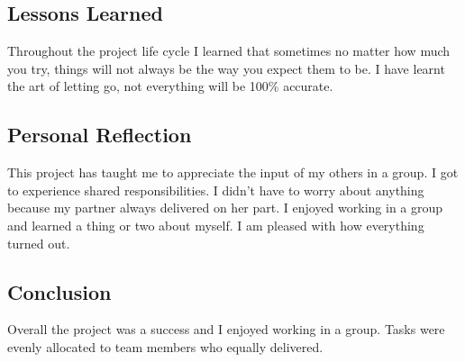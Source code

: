 \documentclass[10pt,twocolumn]{witseiepaper}
\begin{document}
\subsection{\textbf{Lessons Learned}}
Throughout the project life cycle I learned that sometimes no matter how much you try, 
things will not always be the way you expect them to be. I have learnt the art of letting go, not everything will be 100\% accurate.

\subsection{\textbf{Personal Reflection}}
This project has taught me to appreciate the input of my others in a group. I got to experience shared responsibilities. I didn't have to worry about anything because my partner always delivered on her part. I enjoyed working in a group and learned a thing or two about myself. I am pleased with how everything turned out.

\subsection{\textbf{Conclusion}}
Overall the project was a success and I enjoyed working in a group. Tasks were evenly allocated to team members who equally delivered.








\end{document}
